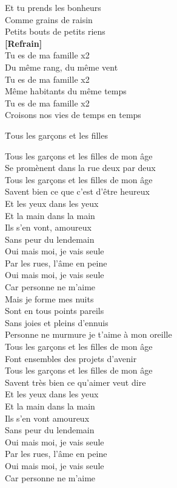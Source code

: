 \documentclass{novel}
\begin{document}
\begin{multicols}{2}
Et tu prends les bonheurs \\
Comme grains de raisin \\
Petits bouts de petits riens \\

\textbf{[Refrain]}\\

Tu es de ma famille x2 \\
Du même rang, du même vent \\
Tu es de ma famille x2 \\
Même habitants du même temps \\
Tu es de ma famille x2 \\
Croisons nos vies de temps en temps 
\end{multicols}

\newpage
\small
\h*{Tous les garçons et les filles}

Tous les garçons et les filles de mon âge \\
Se promènent dans la rue deux par deux \\
Tous les garçons et les filles de mon âge \\
Savent bien ce que c'est d'être heureux \\
Et les yeux dans les yeux \\
Et la main dans la main \\
Ils s'en vont, amoureux \\
Sans peur du lendemain \\
Oui mais moi, je vais seule \\
Par les rues, l'âme en peine \\
Oui mais moi, je vais seule \\
Car personne ne m'aime \\

Mais je forme mes nuits \\
Sont en tous points pareils \\
Sans joies et pleins d'ennuis \\
Personne ne murmure je t'aime à mon oreille \\

Tous les garçons et les filles de mon âge \\
Font ensembles des projets d'avenir \\
Tous les garçons et les filles de mon âge \\
Savent très bien ce qu'aimer veut dire \\
Et les yeux dans les yeux \\
Et la main dans la main \\
Ils s'en vont amoureux \\
Sans peur du lendemain \\
Oui mais moi, je vais seule \\
Par les rues, l'âme en peine \\
Oui mais moi, je vais seule \\
Car personne ne m'aime \\
\end{document}

